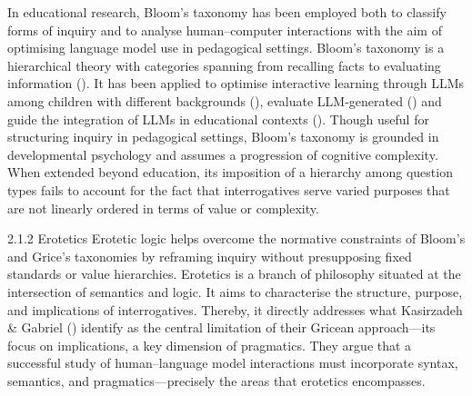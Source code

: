 \documentclass[
  12pt,
]{article}
\begin{document}
In educational research, Bloom's taxonomy has been employed both to classify forms of inquiry and to analyse human--computer interactions with the aim of optimising language model use in pedagogical settings. Bloom's taxonomy is a hierarchical theory with categories spanning from recalling facts to evaluating information (). It has been applied to optimise interactive learning through LLMs among children with different backgrounds (), evaluate LLM-generated () and guide the integration of LLMs in educational contexts (). Though useful for structuring inquiry in pedagogical settings, Bloom's taxonomy is grounded in developmental psychology and assumes a progression of cognitive complexity. When extended beyond education, its imposition of a hierarchy among question types fails to account for the fact that interrogatives serve varied purposes that are not linearly ordered in terms of value or complexity.

2.1.2 Erotetics
Erotetic logic helps overcome the normative constraints of Bloom's and Grice's taxonomies by reframing inquiry without presupposing fixed standards or value hierarchies. Erotetics is a branch of philosophy situated at the intersection of semantics and logic. It aims to characterise the structure, purpose, and implications of interrogatives. Thereby, it directly addresses what Kasirzadeh \& Gabriel () identify as the central limitation of their Gricean approach---its focus on implications, a key dimension of pragmatics. They argue that a successful study of human--language model interactions must incorporate syntax, semantics, and pragmatics---precisely the areas that erotetics encompasses.
\end{document}
